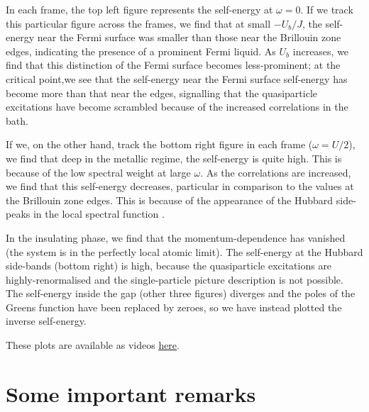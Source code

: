 \documentclass{report}
\numberwithin{equation}{section}
\begin{document}
\begin{center}
\begin{tabular}{c|c}
\end{tabular}
\label{four-self}
\end{center}

In each frame, the top left figure represents the self-energy at \(\omega=0\). If we track this particular figure across the frames, we find that at small \(-U_b/J\), the self-energy near the Fermi surface was smaller than those near the Brillouin zone edges, indicating the presence of a prominent Fermi liquid. As \(U_b\) increases, we find that this distinction of the Fermi surface becomes less-prominent; at the critical point,we see that the self-energy near the Fermi surface self-energy has become more than that near the edges, signalling that the quasiparticle excitations have become scrambled because of the increased correlations in the bath.

If we, on the other hand, track the bottom right figure in each frame (\(\omega = U/2\)), we find that deep in the metallic regime, the self-energy is quite high. This is because of the low spectral weight at large \(\omega\). As the correlations are increased, we find that  this self-energy decreases, particular in comparison to the values at the Brillouin zone edges. This is because of the appearance of the Hubbard side-peaks in the local spectral function
.

In the insulating phase, we find that the momentum-dependence has vanished (the system is in the perfectly local atomic limit). The self-energy at the Hubbard side-bands (bottom right) is high, because the quasiparticle excitations are highly-renormalised and the single-particle picture description is not possible. The self-energy inside the gap (other three figures) diverges and the poles of the Greens function have been replaced by zeroes, so we have instead plotted the inverse self-energy.

These plots are available as videos \href{https://abhirup-m.github.io/misc-sigma/}{\underline{here}}.

\clearpage
\section{Some important remarks}
\end{document}
